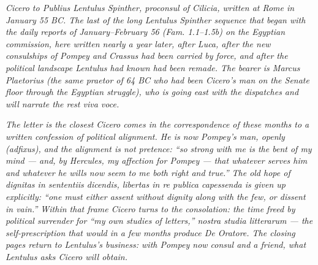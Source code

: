 
\textit{Cicero to Publius Lentulus Spinther, proconsul of
Cilicia, written at Rome in January 55 BC. The last of the
long Lentulus Spinther sequence that began with the daily
reports of January--February 56 (\textit{Fam.} 1.1--1.5b)
on the Egyptian commission, here written nearly a year
later, after Luca, after the new consulships of Pompey and
Crassus had been carried by force, and after the political
landscape Lentulus had known had been remade. The bearer is
Marcus Plaetorius (the same praetor of 64 BC who had been
Cicero's man on the Senate floor through the Egyptian
struggle), who is going east with the dispatches and will
narrate the rest \textit{viva voce}.}

\textit{The letter is the closest Cicero comes in the
correspondence of these months to a written confession of
political alignment. He is now Pompey's man, openly
\textit{(adfixus)}, and the alignment is not pretence: ``so
strong with me is the bent of my mind --- and, by Hercules,
my affection for Pompey --- that whatever serves him and
whatever he wills now seem to me both right and true.'' The
old hope of \textit{dignitas in sententiis dicendis, libertas
in re publica capessenda} is given up explicitly: ``one must
either assent without dignity along with the few, or dissent
in vain.'' Within that frame Cicero turns to the consolation:
the time freed by political surrender for ``my own studies of
letters,'' \textit{nostra studia litterarum} --- the
self-prescription that would in a few months produce
\textit{De Oratore}. The closing pages return to Lentulus's
business: with Pompey now consul and a friend, what Lentulus
asks Cicero will obtain.}

